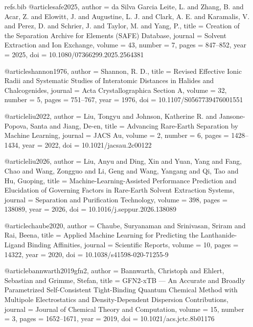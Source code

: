 \begin{filecontents}[overwrite]{refs.bib}
@article{safe2025,
  author  = {da Silva Garcia Leite, L. and Zhang, B. and Acar, Z. and
             Elowitt, J. and Augustine, L. J. and Clark, A. E. and
             Karamalis, V. and Perez, D. and Schrier, J. and
             Taylor, M. and Yang, P.},
  title   = {Creation of the Separation Archive for Elements ({SAFE}) Database},
  journal = {Solvent Extraction and Ion Exchange},
  volume  = {43},
  number  = {7},
  pages   = {847--852},
  year    = {2025},
  doi     = {10.1080/07366299.2025.2564381}
}

@article{shannon1976,
  author  = {Shannon, R. D.},
  title   = {Revised Effective Ionic Radii and Systematic Studies of
             Interatomic Distances in Halides and Chalcogenides},
  journal = {Acta Crystallographica Section A},
  volume  = {32},
  number  = {5},
  pages   = {751--767},
  year    = {1976},
  doi     = {10.1107/S0567739476001551}
}

@article{liu2022,
  author  = {Liu, Tongyu and Johnson, Katherine R. and
             Jansone-Popova, Santa and Jiang, De-en},
  title   = {Advancing Rare-Earth Separation by Machine Learning},
  journal = {JACS Au},
  volume  = {2},
  number  = {6},
  pages   = {1428--1434},
  year    = {2022},
  doi     = {10.1021/jacsau.2c00122}
}

@article{liu2026,
  author  = {Liu, Anyu and Ding, Xin and Yuan, Yang and Fang, Chao and
             Wang, Zongguo and Li, Geng and Wang, Yangang and Qi, Tao and
             Hu, Guoping},
  title   = {Machine-Learning-Assisted Performance Prediction and Elucidation
             of Governing Factors in Rare-Earth Solvent Extraction Systems},
  journal = {Separation and Purification Technology},
  volume  = {398},
  pages   = {138089},
  year    = {2026},
  doi     = {10.1016/j.seppur.2026.138089}
}

@article{chaube2020,
  author  = {Chaube, Suryanaman and Srinivasan, Sriram and Rai, Beena},
  title   = {Applied Machine Learning for Predicting the Lanthanide-Ligand
             Binding Affinities},
  journal = {Scientific Reports},
  volume  = {10},
  pages   = {14322},
  year    = {2020},
  doi     = {10.1038/s41598-020-71255-9}
}

@article{bannwarth2019gfn2,
  author  = {Bannwarth, Christoph and Ehlert, Sebastian and Grimme, Stefan},
  title   = {{GFN2-xTB} --- An Accurate and Broadly Parametrized
             Self-Consistent Tight-Binding Quantum Chemical Method with
             Multipole Electrostatics and Density-Dependent
             Dispersion Contributions},
  journal = {Journal of Chemical Theory and Computation},
  volume  = {15},
  number  = {3},
  pages   = {1652--1671},
  year    = {2019},
  doi     = {10.1021/acs.jctc.8b01176}
}


\end{filecontents}

